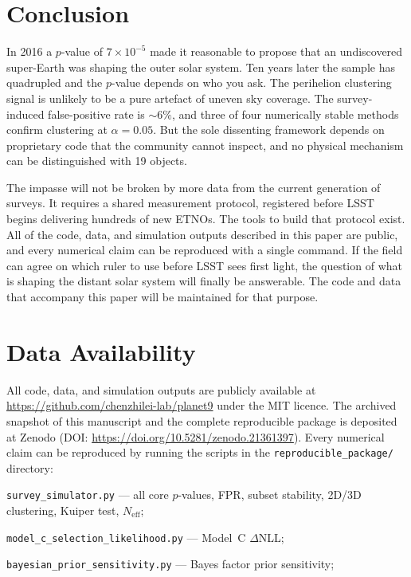 \documentclass[usenatbib]{mnras}
\begin{document}
\section{Conclusion}

In 2016 a $p$-value of $7\times10^{-5}$ made it reasonable to propose that an undiscovered super-Earth was shaping the outer solar system. Ten years later the sample has quadrupled and the $p$-value depends on who you ask. The perihelion clustering signal is unlikely to be a pure artefact of uneven sky coverage. The survey-induced false-positive rate is $\sim6\%$, and three of four numerically stable methods confirm clustering at $\alpha=0.05$. But the sole dissenting framework depends on proprietary code that the community cannot inspect, and no physical mechanism can be distinguished with 19 objects.

The impasse will not be broken by more data from the current generation of surveys. It requires a shared measurement protocol, registered before LSST begins delivering hundreds of new ETNOs. The tools to build that protocol exist. All of the code, data, and simulation outputs described in this paper are public, and every numerical claim can be reproduced with a single command. If the field can agree on which ruler to use before LSST sees first light, the question of what is shaping the distant solar system will finally be answerable. The code and data that accompany this paper will be maintained for that purpose.

\section*{Data Availability}

All code, data, and simulation outputs are publicly available at \url{https://github.com/chenzhilei-lab/planet9} under the MIT licence. The archived snapshot of this manuscript and the complete reproducible package is deposited at Zenodo (DOI: \url{https://doi.org/10.5281/zenodo.21361397}). Every numerical claim can be reproduced by running the scripts in the \texttt{reproducible\_package/} directory:

\smallskip
\noindent\texttt{survey\_simulator.py} --- all core $p$-values, FPR, subset stability, 2D/3D clustering, Kuiper test, $N_\mathrm{eff}$;

\noindent\texttt{model\_c\_selection\_likelihood.py} --- Model~C $\Delta$NLL;

\noindent\texttt{bayesian\_prior\_sensitivity.py} --- Bayes factor prior sensitivity;
\end{document}
